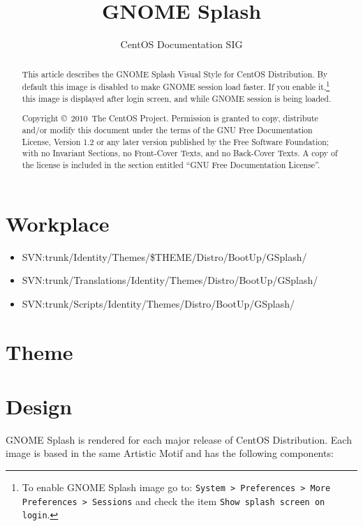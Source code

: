 \documentclass{article}
\title{GNOME Splash}
\author{CentOS Documentation SIG}
\begin{document}
\maketitle

\begin{abstract} 

This article describes the GNOME Splash Visual Style for CentOS
Distribution. By default this image is disabled to make GNOME session
load faster. If you enable it,\footnote{To enable GNOME Splash image
go to: \texttt{System > Preferences > More Preferences > Sessions} and
check the item \texttt{Show splash screen on login}.} this image is
displayed after login screen, and while GNOME session is being loaded. 

Copyright \copyright\ 2010\ The CentOS Project. Permission is
granted to copy, distribute and/or modify this document under the
terms of the GNU Free Documentation License, Version 1.2 or any later
version published by the Free Software Foundation; with no Invariant
Sections, no Front-Cover Texts, and no Back-Cover Texts. A copy of the
license is included in the section entitled ``GNU Free Documentation
License''.  
\end{abstract}

\tableofcontents

\section{Workplace}
\begin{itemize}
\item SVN:trunk/Identity/Themes/\$THEME/Distro/BootUp/GSplash/
\item SVN:trunk/Translations/Identity/Themes/Distro/BootUp/GSplash/
\item SVN:trunk/Scripts/Identity/Themes/Distro/BootUp/GSplash/
\end{itemize}

\section{Theme}



\section{Design}

GNOME Splash is rendered for each major release of CentOS
Distribution. Each image is based in the same Artistic Motif and has
the following components:
\end{document}
